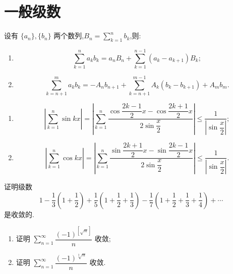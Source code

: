 \documentclass[../数学分析培优讲义.tex]{subfiles}
\begin{document}
\section{一般级数}

\begin{proposition}
设有 $\{a_n\},\{b_n\}$ 两个数列,$\displaystyle B_n=\sum\limits_{k=1}^nb_k$,则:
\begin{enumerate}[label=(\arabic*)]
    \item
    \[
        \sum\limits_{k=1}^na_kb_k
        =a_nB_n+\sum\limits_{k=1}^{n-1}(a_k-a_{k+1})B_k;
    \]
    \item
    \[
        \sum\limits_{k=n+1}^ma_kb_k
        =-A_nb_{n+1}+\sum\limits_{k=n+1}^{m-1}A_k(b_k-b_{k+1})+A_mb_m.
    \]
\end{enumerate}
\end{proposition}

\begin{proposition}[\markstar]
\begin{enumerate}[label=(\arabic*)]
    \item
    \[
        \left|\sum\limits_{k=1}^n\sin kx\right|
        =\left|\sum\limits_{k=1}^n
        \dfrac{\cos\dfrac{2k-1}{2}x-\cos\dfrac{2k+1}{2}x}{2\sin\dfrac{x}{2}}\right|
        \leq\dfrac{1}{|\sin\dfrac{x}{2}|};
    \]
    \item
    \[
        \left|\sum\limits_{k=1}^n\cos kx\right|
        =\left|\sum\limits_{k=1}^n
        \dfrac{\sin\dfrac{2k+1}{2}x-\sin\dfrac{2k-1}{2}x}{2\sin\dfrac{x}{2}}\right|
        \leq\dfrac{1}{|\sin\dfrac{x}{2}|}.
    \]
\end{enumerate}
\end{proposition}

\begin{example}
证明级数
\[
    1-\dfrac{1}{3}\left(1+\dfrac{1}{2}\right)
    +\dfrac{1}{5}\left(1+\dfrac{1}{2}+\dfrac{1}{3}\right)
    -\dfrac{1}{7}\left(1+\dfrac{1}{2}+\dfrac{1}{3}+\dfrac{1}{4}\right)+\cdots
\]
是收敛的.
\end{example}
\exampleblank

\begin{example}[\markstar]
\begin{enumerate}[label=(\arabic*)]
    \item 证明 $\displaystyle\sum\limits_{n=1}^{\infty}\dfrac{(-1)^{[\sqrt n]}}{n}$ 收敛;
    \item 证明 $\displaystyle\sum\limits_{n=1}^{\infty}\dfrac{(-1)^{\sqrt[3]{n}}}{n}$ 收敛.
\end{enumerate}
\end{example}
\exampleblank
\end{document}

